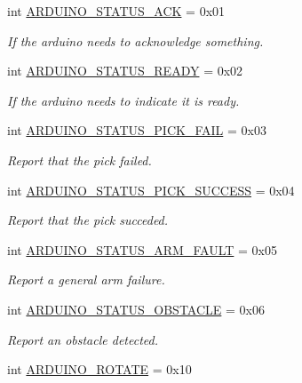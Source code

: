 \begin{DoxyCompactItemize}
int \mbox{\hyperlink{namespaceconstants_a1457f970f66c031b379dac8ef6d7e131}{A\+R\+D\+U\+I\+N\+O\+\_\+\+S\+T\+A\+T\+U\+S\+\_\+\+A\+CK}} = 0x01
\begin{DoxyCompactList}\small\item\em If the arduino needs to acknowledge something. \end{DoxyCompactList}\item 
int \mbox{\hyperlink{namespaceconstants_a92e64e2f09948e66a5c52e4bb6d0b1c3}{A\+R\+D\+U\+I\+N\+O\+\_\+\+S\+T\+A\+T\+U\+S\+\_\+\+R\+E\+A\+DY}} = 0x02
\begin{DoxyCompactList}\small\item\em If the arduino needs to indicate it is ready. \end{DoxyCompactList}\item 
int \mbox{\hyperlink{namespaceconstants_ad2f83c4703b56c7856164f300c88a266}{A\+R\+D\+U\+I\+N\+O\+\_\+\+S\+T\+A\+T\+U\+S\+\_\+\+P\+I\+C\+K\+\_\+\+F\+A\+IL}} = 0x03
\begin{DoxyCompactList}\small\item\em Report that the pick failed. \end{DoxyCompactList}\item 
int \mbox{\hyperlink{namespaceconstants_a5567eabdcef157ce5b607bab1ad6e5af}{A\+R\+D\+U\+I\+N\+O\+\_\+\+S\+T\+A\+T\+U\+S\+\_\+\+P\+I\+C\+K\+\_\+\+S\+U\+C\+C\+E\+SS}} = 0x04
\begin{DoxyCompactList}\small\item\em Report that the pick succeded. \end{DoxyCompactList}\item 
int \mbox{\hyperlink{namespaceconstants_a2d478e3a682d0ada3f13bfa1a3b0543a}{A\+R\+D\+U\+I\+N\+O\+\_\+\+S\+T\+A\+T\+U\+S\+\_\+\+A\+R\+M\+\_\+\+F\+A\+U\+LT}} = 0x05
\begin{DoxyCompactList}\small\item\em Report a general arm failure. \end{DoxyCompactList}\item 
int \mbox{\hyperlink{namespaceconstants_abc0b60b03096dc294325d894c7418ae2}{A\+R\+D\+U\+I\+N\+O\+\_\+\+S\+T\+A\+T\+U\+S\+\_\+\+O\+B\+S\+T\+A\+C\+LE}} = 0x06
\begin{DoxyCompactList}\small\item\em Report an obstacle detected. \end{DoxyCompactList}\item 
int \mbox{\hyperlink{namespaceconstants_ae9932657445a57d6c7343fd8866ed04e}{A\+R\+D\+U\+I\+N\+O\+\_\+\+R\+O\+T\+A\+TE}} = 0x10

\end{DoxyCompactItemize}

